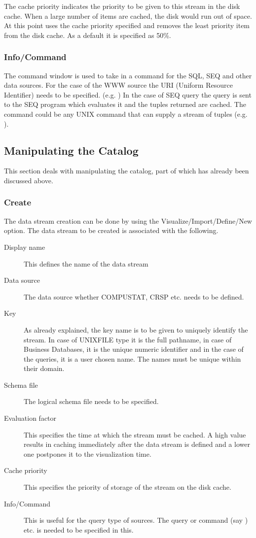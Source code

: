 The cache priority indicates the priority to be given to this stream
in the disk cache. When a large number of items are cached, the disk
would run out of space. At this point \Devise uses the cache priority
specified and removes the least priority item from the disk cache. As
a default it is specified as 50\%.

\subsubsection{Info/Command}

The command window is used to take in a command for the SQL, SEQ and
other data sources. For the case of the WWW source the URI (Uniform
Resource Identifier) needs to be specified. (e.g. ) In
the case of SEQ query the query is sent to the SEQ program which
evaluates it and the tuples returned are cached. The command could be
any UNIX command that can supply a stream of tuples
(e.g. ).

\subsection{Manipulating the Catalog}

This section deals with manipulating the catalog, part of which has
already been discussed above.

\subsubsection{Create}

The data stream creation can be done by using the
Visualize/Import/Define/New option.  The data stream to be created is
associated with the following.

\begin{description}
\item[Display name] This defines the name of the data stream
\item[Data source] The data source whether COMPUSTAT, CRSP etc. needs
to be defined.
\item[Key] As already explained, the key name is to be given to
uniquely identify the stream. In case of UNIXFILE type it is the full
pathname, in case of Business Databases, it is the unique numeric
identifier and in the case of the queries, it is a user chosen
name. The names must be unique within their domain.
\item[Schema file] The logical schema file needs to be specified.
\item[Evaluation factor] This specifies the time at which the stream
must be cached. A high value results in caching immediately after the
data stream is defined and a lower one postpones it to the
visualization time.
\item[Cache priority] This specifies the priority of storage of the
stream on the disk cache.
\item[Info/Command] This is useful for the query type of sources. The
query or command (say ) etc. is needed to be
specified in this.
\end{description}

